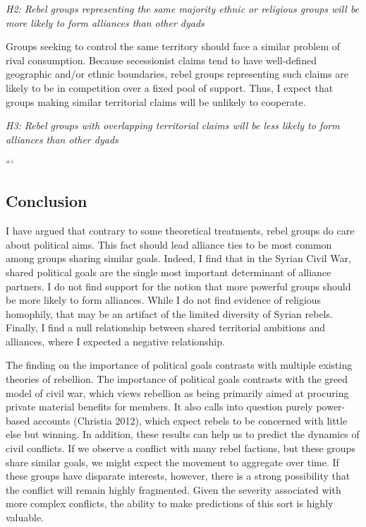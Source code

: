 \documentclass[12pt,]{article}
\begin{document}
\emph{H2: Rebel groups representing the same majority ethnic or
religious groups will be more likely to form alliances than other dyads}

Groups seeking to control the same territory should face a similar
problem of rival consumption. Because secessionist claims tend to have
well-defined geographic and/or ethnic boundaries, rebel groups
representing such claims are likely to be in competition over a fixed
pool of support. Thus, I expect that groups making similar territorial
claims will be unlikely to cooperate.

\emph{H3: Rebel groups with overlapping territorial claims will be less
likely to form alliances than other dyads}

```

\subsection{Conclusion}\label{conclusion}

I have argued that contrary to some theoretical treatments, rebel groups
do care about political aims. This fact should lead alliance ties to be
most common among groups sharing similar goals. Indeed, I find that in
the Syrian Civil War, shared political goals are the single most
important determinant of alliance partners. I do not find support for
the notion that more powerful groups should be more likely to form
alliances. While I do not find evidence of religious homophily, that may
be an artifact of the limited diversity of Syrian rebels. Finally, I
find a null relationship between shared territorial ambitions and
alliances, where I expected a negative relationship.

The finding on the importance of political goals contrasts with multiple
existing theories of rebellion. The importance of political goals
contrasts with the greed model of civil war, which views rebellion as
being primarily aimed at procuring private material benefits for
members. It also calls into question purely power-based accounts
(Christia 2012), which expect rebels to be concerned with little else
but winning. In addition, these results can help us to predict the
dynamics of civil conflicts. If we observe a conflict with many rebel
factions, but these groups share similar goals, we might expect the
movement to aggregate over time. If these groups have disparate
interests, however, there is a strong possibility that the conflict will
remain highly fragmented. Given the severity associated with more
complex conflicts, the ability to make predictions of this sort is
highly valuable.
\end{document}
